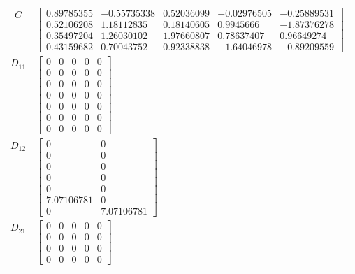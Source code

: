\begin{tabular}{cl}
   $C$    & $\left[\begin{matrix}0.89785355 & -0.55735338 & 0.52036099 & -0.02976505 & -0.25889531\\0.52106208 & 1.18112835 & 0.18140605 & 0.9945666 & -1.87376278\\0.35497204 & 1.26030102 & 1.97660807 & 0.78637407 & 0.96649274\\0.43159682 & 0.70043752 & 0.92338838 & -1.64046978 & -0.89209559\end{matrix}\right]$                                                                          \\
 $D_{11}$ & $\left[\begin{matrix}0 & 0 & 0 & 0 & 0\\0 & 0 & 0 & 0 & 0\\0 & 0 & 0 & 0 & 0\\0 & 0 & 0 & 0 & 0\\0 & 0 & 0 & 0 & 0\\0 & 0 & 0 & 0 & 0\\0 & 0 & 0 & 0 & 0\end{matrix}\right]$                                                                                                                                                                                                          \\
 $D_{12}$ & $\left[\begin{matrix}0 & 0\\0 & 0\\0 & 0\\0 & 0\\0 & 0\\7.07106781 & 0\\0 & 7.07106781\end{matrix}\right]$                                                                                                                                                                                                                                                                            \\
 $D_{21}$ & $\left[\begin{matrix}0 & 0 & 0 & 0 & 0\\0 & 0 & 0 & 0 & 0\\0 & 0 & 0 & 0 & 0\\0 & 0 & 0 & 0 & 0\end{matrix}\right]$                                                                                                                                                                                                                                                                   \\
\hline
\end{tabular}